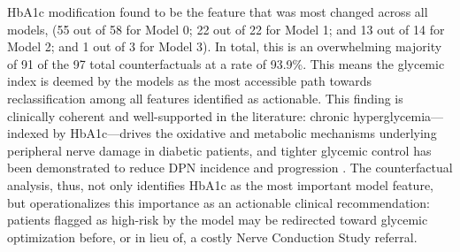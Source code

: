 \documentclass[pdflatex,sn-vancouver-num]{sn-jnl}
\begin{document}

HbA1c modification found to be the feature that was most changed across all models, (55 out of 58 for Model 0; 22 out of 22 for Model 1; and 13 out of 14 for Model 2; and 1 out of 3 for Model 3). In total, this is an overwhelming majority of 91 of the 97 total counterfactuals at a rate of 93.9\%. This means the glycemic index is deemed by the models as the most accessible path towards reclassification among all features identified as actionable.
This finding is clinically coherent and well-supported in the literature: chronic hyperglycemia—indexed by HbA1c—drives the oxidative and metabolic mechanisms underlying peripheral nerve damage in diabetic patients, and tighter glycemic control has been demonstrated to reduce DPN incidence and progression \cite{callaghan2012,tesfaye2010}. The counterfactual analysis, thus, not only identifies HbA1c as the most important model feature, but operationalizes this importance as an actionable clinical recommendation: patients flagged as high-risk by the model may be redirected toward glycemic optimization before, or in lieu of, a costly Nerve Conduction Study referral.
\end{document}
